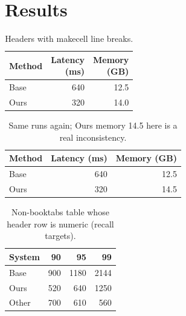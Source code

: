 \documentclass{article}
\begin{document}
\section{Results}
\begin{table}[h]\centering\caption{Headers with makecell line breaks.}\label{tab:a}
\begin{tabular}{lrr}
\toprule
Method & \makecell{Latency\\(ms)} & \makecell{Memory\\(GB)} \\
\midrule
Base & 640 & 12.5 \\
Ours & 320 & 14.0 \\
\bottomrule
\end{tabular}\end{table}
\begin{table}[h]\centering\caption{Same runs again; Ours memory 14.5 here is a real inconsistency.}\label{tab:b}
\begin{tabular}{lrr}
\toprule
Method & Latency (ms) & Memory (GB) \\
\midrule
Base & 640 & 12.5 \\
Ours & 320 & 14.5 \\
\bottomrule
\end{tabular}\end{table}
\begin{table}[h]\centering\caption{Non-booktabs table whose header row is numeric (recall targets).}
\begin{tabular}{|l|r|r|r|}
\hline
System & 90 & 95 & 99 \\
\hline
Base & 900 & 1180 & 2144 \\
Ours & 520 & 640 & 1250 \\
Other & 700 & 610 & 560 \\
\hline
\end{tabular}\end{table}
\end{document}

